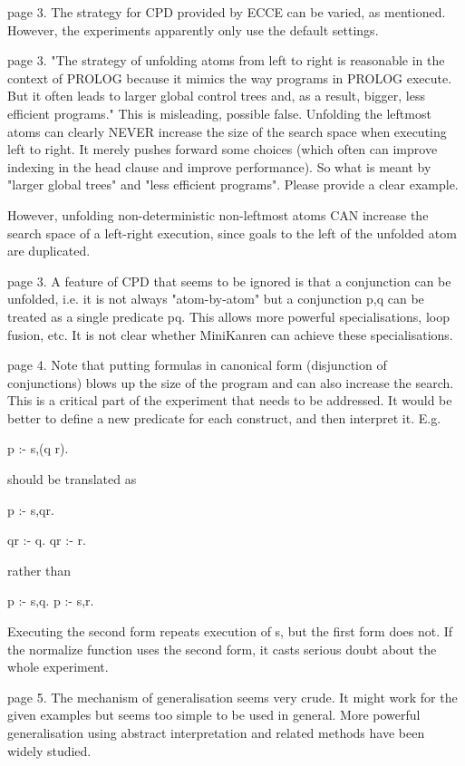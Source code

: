 page 3.  The strategy for CPD provided by ECCE can be varied, as mentioned.  However, the experiments apparently only use the default settings.

page 3. "The strategy of unfolding atoms from left to right is reasonable in the context of PROLOG because it mimics the way programs in PROLOG execute. But it often leads to larger global control trees and, as a result, bigger, less efficient programs."  This is misleading, possible false.  Unfolding the leftmost atoms can clearly NEVER increase the size of the search space when executing left to right.  It merely pushes forward some choices (which often can improve indexing in the head clause and improve performance). So what is meant by "larger global trees" and "less efficient programs". Please provide a clear example.

However, unfolding non-deterministic non-leftmost atoms CAN increase the search space of a left-right execution, since goals to the left of the unfolded atom are duplicated.


page 3. A feature of CPD that seems to be ignored is that a conjunction can be unfolded, i.e. it is not always "atom-by-atom" but a conjunction p,q can be treated as a single predicate pq.  This allows more powerful specialisations, loop fusion, etc.  It is not clear whether MiniKanren can achieve these specialisations.


page 4.  Note that putting formulas in canonical form (disjunction of conjunctions) blows up the size of the program and can also increase the search.  This is a critical part of the experiment that needs to be addressed.  It would be better to define a new predicate for each construct, and then interpret it.  E.g.

p :- s,(q \/ r).

should be translated as

p :- s,qr.

qr :- q.
qr :- r.

rather than

p :- s,q.
p :- s,r.

Executing the second form repeats execution of s, but the first form does not.  If the normalize function uses the second form, it casts serious doubt about the whole experiment.

page 5.  The mechanism of generalisation seems very crude.  It might work for the given examples but seems too simple to be used in general.  More powerful generalisation using abstract interpretation and related methods have been widely studied.

